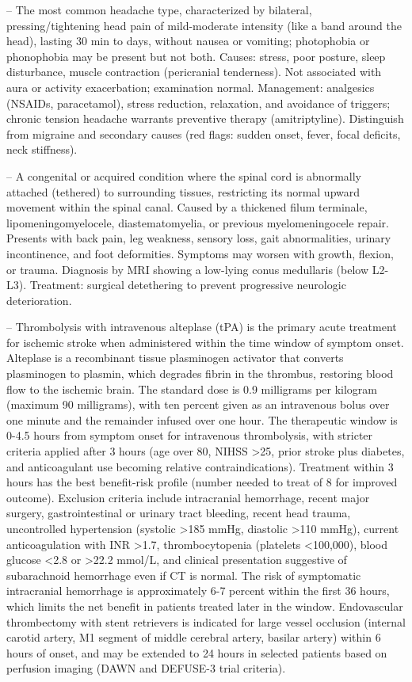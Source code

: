 -- The most common headache type, characterized by bilateral, pressing/tightening head pain of mild-moderate intensity (like a band around the head), lasting 30 min to days, without nausea or vomiting; photophobia or phonophobia may be present but not both. Causes: stress, poor posture, sleep disturbance, muscle contraction (pericranial tenderness). Not associated with aura or activity exacerbation; examination normal. Management: analgesics (NSAIDs, paracetamol), stress reduction, relaxation, and avoidance of triggers; chronic tension headache warrants preventive therapy (amitriptyline). Distinguish from migraine and secondary causes (red flags: sudden onset, fever, focal deficits, neck stiffness).

-- A congenital or acquired condition where the spinal cord is abnormally attached (tethered) to surrounding tissues, restricting its normal upward movement within the spinal canal. Caused by a thickened filum terminale, lipomeningomyelocele, diastematomyelia, or previous myelomeningocele repair. Presents with back pain, leg weakness, sensory loss, gait abnormalities, urinary incontinence, and foot deformities. Symptoms may worsen with growth, flexion, or trauma. Diagnosis by MRI showing a low-lying conus medullaris (below L2-L3). Treatment: surgical detethering to prevent progressive neurologic deterioration.

-- Thrombolysis with intravenous alteplase (tPA) is the primary acute treatment for ischemic stroke when administered within the time window of symptom onset. Alteplase is a recombinant tissue plasminogen activator that converts plasminogen to plasmin, which degrades fibrin in the thrombus, restoring blood flow to the ischemic brain. The standard dose is 0.9 milligrams per kilogram (maximum 90 milligrams), with ten percent given as an intravenous bolus over one minute and the remainder infused over one hour. The therapeutic window is 0-4.5 hours from symptom onset for intravenous thrombolysis, with stricter criteria applied after 3 hours (age over 80, NIHSS >25, prior stroke plus diabetes, and anticoagulant use becoming relative contraindications). Treatment within 3 hours has the best benefit-risk profile (number needed to treat of 8 for improved outcome). Exclusion criteria include intracranial hemorrhage, recent major surgery, gastrointestinal or urinary tract bleeding, recent head trauma, uncontrolled hypertension (systolic >185 mmHg, diastolic >110 mmHg), current anticoagulation with INR >1.7, thrombocytopenia (platelets <100,000), blood glucose <2.8 or >22.2 mmol/L, and clinical presentation suggestive of subarachnoid hemorrhage even if CT is normal. The risk of symptomatic intracranial hemorrhage is approximately 6-7 percent within the first 36 hours, which limits the net benefit in patients treated later in the window. Endovascular thrombectomy with stent retrievers is indicated for large vessel occlusion (internal carotid artery, M1 segment of middle cerebral artery, basilar artery) within 6 hours of onset, and may be extended to 24 hours in selected patients based on perfusion imaging (DAWN and DEFUSE-3 trial criteria).

